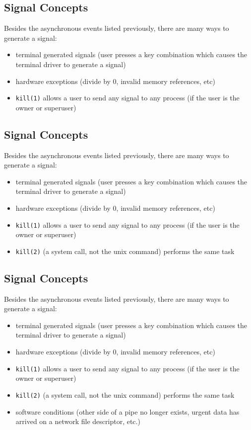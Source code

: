\documentclass[xga]{xdvislides}
\begin{document}
\subsection{Signal Concepts}
Besides the asynchronous events listed previously, there are many ways to
generate a signal:

\begin{itemize}
	\item terminal generated signals (user presses a key combination which causes
		the terminal driver to generate a signal)
	\item hardware exceptions (divide by 0, invalid memory references, etc)
	\item {\tt kill(1)} allows a user to send any signal to any process (if the
		user is the owner or superuser)
\end{itemize}

\subsection{Signal Concepts}
Besides the asynchronous events listed previously, there are many ways to
generate a signal:

\begin{itemize}
	\item terminal generated signals (user presses a key combination which causes
		the terminal driver to generate a signal)
	\item hardware exceptions (divide by 0, invalid memory references, etc)
	\item {\tt kill(1)} allows a user to send any signal to any process (if the
		user is the owner or superuser)
	\item {\tt kill(2)} (a system call, not the unix command) performs the
		same task
\end{itemize}


\subsection{Signal Concepts}
Besides the asynchronous events listed previously, there are many ways to
generate a signal:

\begin{itemize}
	\item terminal generated signals (user presses a key combination which causes
		the terminal driver to generate a signal)
	\item hardware exceptions (divide by 0, invalid memory references, etc)
	\item {\tt kill(1)} allows a user to send any signal to any process (if the
		user is the owner or superuser)
	\item {\tt kill(2)} (a system call, not the unix command) performs the
		same task
	\item software conditions (other side of a pipe no longer exists, urgent data
		has arrived on a network file descriptor, etc.)
\end{itemize}
\end{document}
